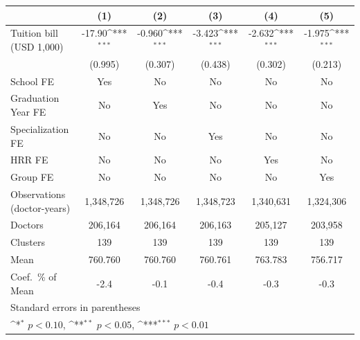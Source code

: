 {
\def\sym#1{\ifmmode^{#1}\else\(^{#1}\)\fi}
\begin{tabular}{l*{5}{c}}
\hline\hline
                    &\multicolumn{1}{c}{(1)}         &\multicolumn{1}{c}{(2)}         &\multicolumn{1}{c}{(3)}         &\multicolumn{1}{c}{(4)}         &\multicolumn{1}{c}{(5)}         \\
\hline
Tuition bill (USD 1,000)&      -17.90\sym{***}&      -0.960\sym{***}&      -3.423\sym{***}&      -2.632\sym{***}&      -1.975\sym{***}\\
                    &     (0.995)         &     (0.307)         &     (0.438)         &     (0.302)         &     (0.213)         \\
[1em]
School FE           &         Yes         &          No         &          No         &          No         &          No         \\
[1em]
Graduation Year FE  &          No         &         Yes         &          No         &          No         &          No         \\
[1em]
Specialization FE   &          No         &          No         &         Yes         &          No         &          No         \\
[1em]
HRR FE              &          No         &          No         &          No         &         Yes         &          No         \\
[1em]
Group FE            &          No         &          No         &          No         &          No         &         Yes         \\
\hline
Observations (doctor-years)&   1,348,726         &   1,348,726         &   1,348,723         &   1,340,631         &   1,324,306         \\
Doctors             &     206,164         &     206,164         &     206,163         &     205,127         &     203,958         \\
Clusters            &         139         &         139         &         139         &         139         &         139         \\
Mean                &     760.760         &     760.760         &     760.761         &     763.783         &     756.717         \\
Coef.\ \% of Mean   &        -2.4         &        -0.1         &        -0.4         &        -0.3         &        -0.3         \\
\hline\hline
\multicolumn{6}{l}{\footnotesize Standard errors in parentheses}\\
\multicolumn{6}{l}{\footnotesize \sym{*} \(p<0.10\), \sym{**} \(p<0.05\), \sym{***} \(p<0.01\)}\\
\end{tabular}
}
